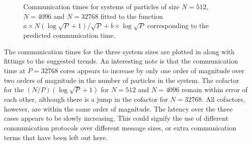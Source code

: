 \begin{figure}
    
    \caption{
        Communication times for systems of particles of size
        $N=512$, $N=4096$ and $N=32768$ fitted to the function
        $a\times{}N(\log{\sqrt{P}} + 1)/\sqrt{P} + b\times{}\log{\sqrt{P}}$
        corresponding to the predicted communication time.
    }
    \label{fig:replicated_systolic_communication_fits}
\end{figure}

The communication times for the three system sizes are plotted in
along with fittings to the suggested trends.
%
An interesting note is that the communication time at $P = 32768$ cores
appears to increase by only one order of magnitude over two orders
of magnitude in the number of particles in the system.
%
The cofactor for the $(N/P) (\log{\sqrt{P}}+1)$ for
$N = 512$ and $N = 4096$ remain within error of each other, although
there is a jump in the cofactor for $N = 32768$.
%
All cofactors, however, are within the same order of magnitude.
%
The latency over the three cases appears to be slowly increasing.
%
This could signify the use of different communication protocols
over different message sizes, or extra communication terms that
have been left out here.
